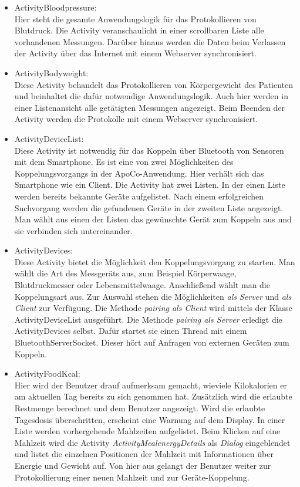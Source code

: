 \begin{itemize}
 \item ActivityBloodpressure:\\
 Hier steht die gesamte Anwendungslogik f\"ur das Protokollieren von Blutdruck.
 Die Activity veranschaulicht in einer scrollbaren Liste alle vorhandenen Messungen.
 Dar\"uber hinaus werden die Daten beim Verlassen der Activity \"uber das Internet mit einem Webserver synchronisiert. 
 
 \item ActivityBodyweight:\\
 Diese Activity behandelt das Protokollieren von K\"orpergewicht des Patienten und beinhaltet die daf\"ur notwendige Anwendungslogik.
 Auch hier werden in einer Listenansicht alle get\"atigten Messungen angezeigt.
 Beim Beenden der Activity werden die Protokolle mit einem Webserver synchronisiert.
 
 \item ActivityDeviceList:\\
 Diese Activity ist notwendig f\"ur das Koppeln \"uber Bluetooth von Sensoren mit dem Smartphone.
 Es ist eine von zwei M\"oglichkeiten des Koppelungsvorgangs in der ApoCo-Anwendung.
 Hier verh\"alt sich das Smartphone wie ein Client.
 Die Activity hat zwei Listen.
 In der einen Liste werden bereits bekannte Ger\"ate aufgelistet.
 Nach einem erfolgreichen Suchvorgang werden die gefundenen Ger\"ate in der zweiten Liste angezeigt.
 Man w\"ahlt aus einen der Listen das gew\"unschte Ger\"at zum Koppeln aus und sie verbinden sich untereinander.
 
 \item ActivityDevices:\\
 Diese Activity bietet die M\"oglichkeit den Koppelungsvorgang zu starten.
 Man w\"ahlt die Art des Messger\"ats aus, zum Beispiel K\"orperwaage, Blutdruckmesser oder Lebensmittelwaage.
 Anschlie\ss{}end w\"ahlt man die Koppelungsart aus.
 Zur Auswahl stehen die M\"oglichkeiten \emph{als Server} und \emph{als Client} zur Verf\"ugung.
 Die Methode \emph{pairing als Client} wird mittels der Klasse ActivityDeviceList ausgef\"uhrt.
 Die Methode \emph{pairing als Server} erledigt die ActivityDevices selbst.
 Daf\"ur startet sie einen Thread mit einem BluetoothServerSocket.
 Dieser h\"ort auf Anfragen von externen Ger\"aten zum Koppeln.

 \item ActivityFoodKcal:\\
 Hier wird der Benutzer drauf aufmerksam gemacht, wieviele Kilokalorien er am aktuellen Tag bereits zu sich genommen hat.
 Zus\"atzlich wird die erlaubte Restmenge berechnet und dem Benutzer angezeigt.
 Wird die erlaubte Tagesdosis \"uberschritten, erscheint eine Warnung auf dem Display.
 In einer Liste werden vorhergehende Mahlzeiten aufgelistet.
 Beim Klicken auf eine Mahlzeit wird die Activity \emph{ActivityMealenergyDetails} als \emph{Dialog} eingeblendet und listet die einzelnen
 Positionen der Mahlzeit mit Informationen \"uber Energie und Gewicht auf.
 Von hier aus gelangt der Benutzer weiter zur Protokollierung einer neuen Mahlzeit und zur Ger\"ate-Koppelung.
 

\end{itemize}
